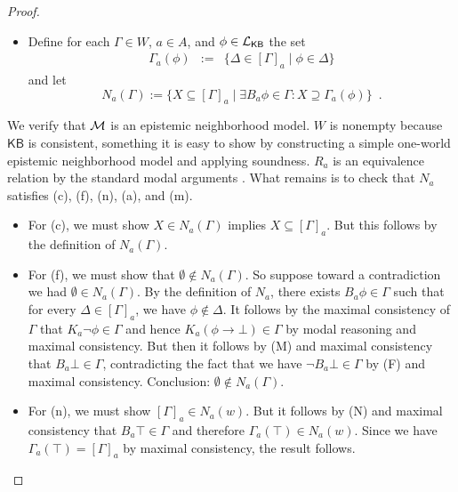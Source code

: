 \documentclass[12pt]{article}
\theoremstyle{definition}
\newcommand{\M}{{\cal M}}      %
\newcommand{\Lang}{{\cal L}}   %
\newcommand{\KB}{{\mathsf{KB}}}                     %
\begin{document}
\begin{proof}
\begin{itemize}
  \item Define for each $\Gamma\in W$, $a\in A$, and
    $\phi\in\Lang_\KB$ the set
    \begin{eqnarray*}
      \Gamma_a(\phi) &:=&
      \{\Delta\in[\Gamma]_a\mid\phi\in\Delta\}
    \end{eqnarray*}
    and let
    \[
    N_a(\Gamma):= \{X\subseteq[\Gamma]_a\mid \exists B_a\phi\in\Gamma:
    X\supseteq\Gamma_a(\phi)\} \enspace.
    \]
  \end{itemize}
  We verify that $\M$ is an epistemic neighborhood model. $W$ is
  nonempty because $\KB$ is consistent, something it is easy to show
  by constructing a simple one-world epistemic neighborhood model and
  applying soundness.  $R_a$ is an equivalence relation by the
  standard modal arguments \cite{BlaRijVen:ml}.  What remains is to
  check that $N_a$ satisfies (c), (f), (n), (a), and (m).
  \begin{itemize}
  \item For (c), we must show $X\in N_a(\Gamma)$ implies
    $X\subseteq[\Gamma]_a$.  But this follows by the definition of
    $N_a(\Gamma)$.

  \item For (f), we must show that $\emptyset\notin N_a(\Gamma)$. So
    suppose toward a contradiction we had $\emptyset\in N_a(\Gamma)$.
    By the definition of $N_a$, there exists $B_a\phi\in\Gamma$ such
    that for every $\Delta\in[\Gamma]_a$, we have $\phi\notin\Delta$.
    It follows by the maximal consistency of $\Gamma$ that
    $K_a\lnot\phi\in\Gamma$ and hence $K_a(\phi\to\bot)\in\Gamma$ by
    modal reasoning and maximal consistency.  But then it follows by
    (M) and maximal consistency that $B_a\bot\in\Gamma$, contradicting
    the fact that we have $\lnot B_a\bot\in\Gamma$ by (F) and maximal
    consistency.  Conclusion: $\emptyset\notin N_a(\Gamma)$.

  \item For (n), we must show $[\Gamma]_a\in N_a(w)$.  But it follows
    by (N) and maximal consistency that $B_a\top\in\Gamma$ and
    therefore $\Gamma_a(\top)\in N_a(w)$.  Since we have
    $\Gamma_a(\top)=[\Gamma]_a$ by maximal consistency, the result
    follows.


\end{itemize}
\end{proof}
\end{document}
